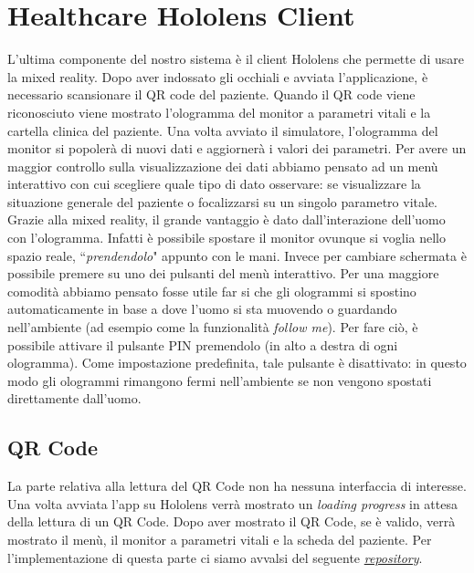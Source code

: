 \section{Healthcare Hololens Client}
L'ultima componente del nostro sistema è il client Hololens che permette di usare la mixed reality. Dopo aver indossato gli occhiali e avviata l'applicazione, è necessario scansionare il QR code del paziente. Quando il QR code viene riconosciuto viene mostrato l'ologramma del monitor a parametri vitali e la cartella clinica del paziente. Una volta avviato il simulatore, l'ologramma del monitor si popolerà di nuovi dati e aggiornerà i valori dei parametri. Per avere un maggior controllo sulla visualizzazione dei dati abbiamo pensato ad un menù interattivo con cui scegliere quale tipo di dato osservare: se visualizzare la situazione generale del paziente o focalizzarsi su un singolo parametro vitale. Grazie alla mixed reality, il grande vantaggio è dato dall'interazione dell'uomo con l'ologramma. Infatti è possibile spostare il monitor ovunque si voglia nello spazio reale, ``\textit{prendendolo}" appunto con le mani. Invece per cambiare schermata è possibile premere su uno dei pulsanti del menù interattivo. Per una maggiore comodità abbiamo pensato fosse utile far si che gli ologrammi si spostino automaticamente in base a dove l'uomo si sta muovendo o guardando nell'ambiente (ad esempio come la funzionalità \textit{follow me}). Per fare ciò, è possibile attivare il pulsante PIN  premendolo (in alto a destra di ogni ologramma). Come impostazione predefinita, tale pulsante è disattivato: in questo modo gli ologrammi rimangono fermi nell'ambiente se non vengono spostati direttamente dall'uomo.

\subsection{QR Code}
La parte relativa alla lettura del QR Code non ha nessuna interfaccia di interesse. Una volta avviata l'app su Hololens verrà mostrato un \textit{loading progress} in attesa della lettura di un QR Code. Dopo aver mostrato il QR Code, se è valido, verrà mostrato il menù, il monitor a parametri vitali e la scheda del paziente. \newline \newline Per l'implementazione di questa parte ci siamo avvalsi del seguente \href{https://github.com/LocalJoost/QRCodeService}{\textit{repository}}.

